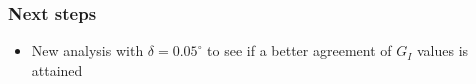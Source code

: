 \documentclass[first,firstsupp,lastsupp,handout,last,hyperref,table]{ETHclass}
\begin{document}
\begin{frame}
\frametitle{\small Next steps}
\vspace{-0.5cm}
\centering
\begin{itemize}[label=]
\item New analysis with $\delta=0.05^{\circ}$ to see if a better agreement of $G_{I}$ values is attained
\end{itemize}
\end{frame}

%
%
%
%
%
%    
%    
% 
%    
%
%
%
%
\end{document}
